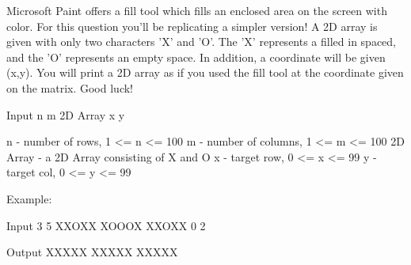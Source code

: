 Microsoft Paint offers a fill tool which fills an enclosed area on the screen with color. For this question you'll be replicating a simpler version! A 2D array is given with only two characters
'X' and 'O'. The 'X' represents a filled in spaced, and the 'O' represents an empty space. In addition, a coordinate will be given (x,y). You will print a 2D array as if you used the fill tool
at the coordinate given on the matrix. Good luck!

Input
n m
2D Array
x y

n - number of rows, 1 <= n <= 100
m - number of columns, 1 <= m <= 100
2D Array - a 2D Array consisting of X and O
x - target row, 0 <= x <= 99
y - target col, 0 <= y <= 99

Example:

Input
3 5
XXOXX
XOOOX
XXOXX
0 2

Output
XXXXX
XXXXX
XXXXX


